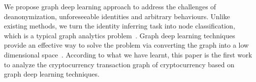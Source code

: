 

We propose graph deep learning approach to address the challenges of deanonymization, unforeseeable identities and arbitrary behaviours.
Unlike existing methods, we turn the identity inferring task into node classification, which is a typical graph analytics problem~\cite{cai2018comprehensive}. Graph deep learning techniques provide an effective way to solve the problem via converting the graph into a low dimensional space~\cite{hamilton2017representation,battaglia2018relational}. %
According to what we have learnt, this paper is the first work to analyze the cryptocurrency transaction graph of cryptocurrency based on graph deep learning techniques.

